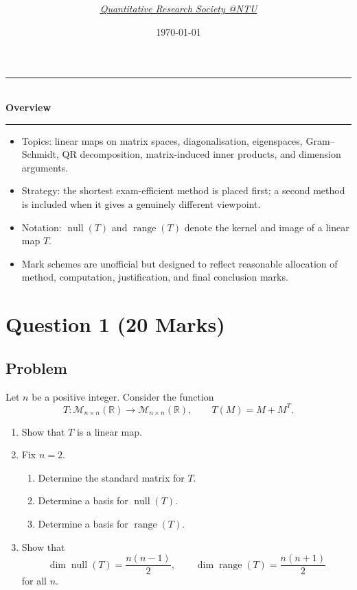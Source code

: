 \documentclass[12pt]{article}
\title{
\Huge \CourseCode\ \CourseName \\[0.3em]
\Large \DocType  \\[0.3em]
\large \ExamMeta
}
\author{
  \textit{\href{https://qrsntu.org}{Quantitative Research Society @NTU}}
}
\date{\today}
\newcommand{\R}{\mathbb{R}}
\newcommand{\M}{\mathcal{M}}
\newcommand{\Null}{\operatorname{null}}
\newcommand{\Range}{\operatorname{range}}
\newenvironment{overview}{
  \par\bigskip
  \begin{center}
    \rule{0.92\linewidth}{0.6pt}\\[-0.2em]
    \textbf{Overview}\\[-0.2em]
    \rule{0.92\linewidth}{0.6pt}
  \end{center}
  \vspace{-0.3em}
  \begin{itemize}[leftmargin=1.6em, itemsep=0.2em, topsep=0.2em]
}{
  \end{itemize}
  \par\bigskip
}
\begin{document}
\maketitle
\thispagestyle{plainfirst}
\pagestyle{main}


\begin{overview}
  \item Topics: linear maps on matrix spaces, diagonalisation, eigenspaces, Gram--Schmidt, QR decomposition, matrix-induced inner products, and dimension arguments.
  \item Strategy: the shortest exam-efficient method is placed first; a second method is included when it gives a genuinely different viewpoint.
  \item Notation: $\Null(T)$ and $\Range(T)$ denote the kernel and image of a linear map $T$.
  \item Mark schemes are unofficial but designed to reflect reasonable allocation of method, computation, justification, and final conclusion marks.
\end{overview}


\newpage
\tableofcontents
\newpage

\section{Question 1 \hfill (20 Marks)}

\subsection{Problem}
Let $n$ be a positive integer. Consider the function
\[
T:\M_{n\times n}(\R)\to \M_{n\times n}(\R),\qquad T(M)=M+M^T.
\]
\begin{enumerate}[label=(\alph*)]
  \item Show that $T$ is a linear map.
  \item Fix $n=2$.
  \begin{enumerate}[label=(\roman*)]
    \item Determine the standard matrix for $T$.
    \item Determine a basis for $\Null(T)$.
    \item Determine a basis for $\Range(T)$.
  \end{enumerate}
  \item Show that
  \[
  \dim\Null(T)=\frac{n(n-1)}2,\qquad
  \dim\Range(T)=\frac{n(n+1)}2
  \]
  for all $n$.
\end{enumerate}
\end{document}
